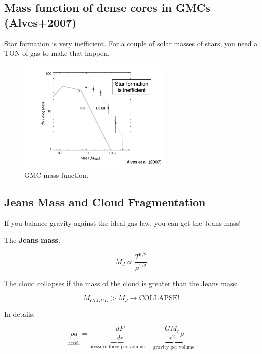 \documentclass{article}
\begin{document}
\subsection{Mass function of dense cores in GMCs (Alves+2007)}



Star formation is very inefficient. For a couple of solar masses of stars, you need a TON of gas to make that happen. 

\begin{figure}
    \centering
    \includegraphics[width=0.66\textwidth]{figs/Screen Shot 2021-09-24 at 3.33.05 PM.png}
    \caption{GMC mass function.}
    \label{fig:gmcmass}
\end{figure}

\subsection{Jeans Mass and Cloud Fragmentation}

If you balance gravity against the ideal gas law, you can get the Jeans mass!

The \textbf{Jeans mass}:

\begin{equation}
    M_J \propto \frac{T^{3/2}}{\rho^{1/2}}
\end{equation}

The cloud collapses if the mass of the cloud is greater than the Jeans mass:

\begin{equation}
    M_{CLOUD} > M_J \rightarrow \text{COLLAPSE!}
\end{equation}

In details:

\begin{equation}
    \underbrace{\rho a}_\text{accel.} = \underbrace{-\frac{dP}{dr}}_\text{pressure force per volume} - \underbrace{\frac{GM_r}{r^2}\rho}_\text{gravity per volume}
\end{equation}
\end{document}
